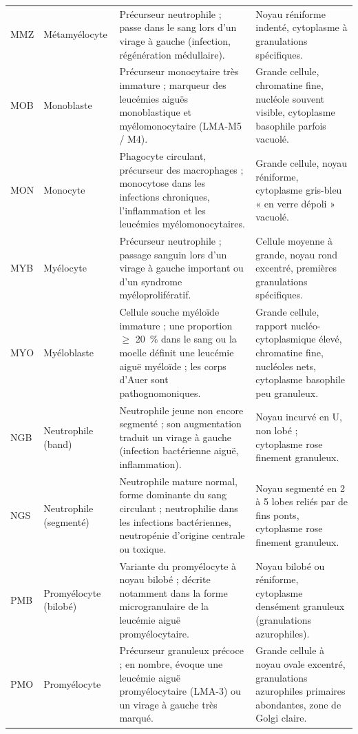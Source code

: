 \begin{longtable}{@{}>{\raggedright\arraybackslash}p{2.6cm} >{\raggedright\arraybackslash}p{2.5cm} >{\raggedright\arraybackslash}p{5.9cm} >{\raggedright\arraybackslash}p{4.0cm}@{}}
  MMZ & Métamyélocyte            & Précurseur neutrophile ; passe dans le sang lors d’un virage à gauche (infection, régénération médullaire). & Noyau réniforme indenté, cytoplasme à granulations spécifiques. \\
  MOB & Monoblaste               & Précurseur monocytaire très immature ; marqueur des leucémies aiguës monoblastique et myélomonocytaire (LMA-M5 / M4). & Grande cellule, chromatine fine, nucléole souvent visible, cytoplasme basophile parfois vacuolé. \\
  MON & Monocyte                 & Phagocyte circulant, précurseur des macrophages ; monocytose dans les infections chroniques, l’inflammation et les leucémies myélomonocytaires. & Grande cellule, noyau réniforme, cytoplasme gris-bleu « en verre dépoli » vacuolé. \\
  MYB & Myélocyte                & Précurseur neutrophile ; passage sanguin lors d’un virage à gauche important ou d’un syndrome myéloprolifératif. & Cellule moyenne à grande, noyau rond excentré, premières granulations spécifiques. \\
  MYO & Myéloblaste              & Cellule souche myéloïde immature ; une proportion $\geq$ 20~\% dans le sang ou la moelle définit une leucémie aiguë myéloïde ; les corps d’Auer sont pathognomoniques. & Grande cellule, rapport nucléo-cytoplasmique élevé, chromatine fine, nucléoles nets, cytoplasme basophile peu granuleux. \\
  NGB & Neutrophile (band)       & Neutrophile jeune non encore segmenté ; son augmentation traduit un virage à gauche (infection bactérienne aiguë, inflammation). & Noyau incurvé en U, non lobé ; cytoplasme rose finement granuleux. \\
  NGS & Neutrophile (segmenté)   & Neutrophile mature normal, forme dominante du sang circulant ; neutrophilie dans les infections bactériennes, neutropénie d’origine centrale ou toxique. & Noyau segmenté en 2 à 5 lobes reliés par de fins ponts, cytoplasme rose finement granuleux. \\
  PMB & Promyélocyte (bilobé)    & Variante du promyélocyte à noyau bilobé ; décrite notamment dans la forme microgranulaire de la leucémie aiguë promyélocytaire. & Noyau bilobé ou réniforme, cytoplasme densément granuleux (granulations azurophiles). \\
  PMO & Promyélocyte             & Précurseur granuleux précoce ; en nombre, évoque une leucémie aiguë promyélocytaire (LMA-3) ou un virage à gauche très marqué. & Grande cellule à noyau ovale excentré, granulations azurophiles primaires abondantes, zone de Golgi claire. \\
\end{longtable}
\endgroup

